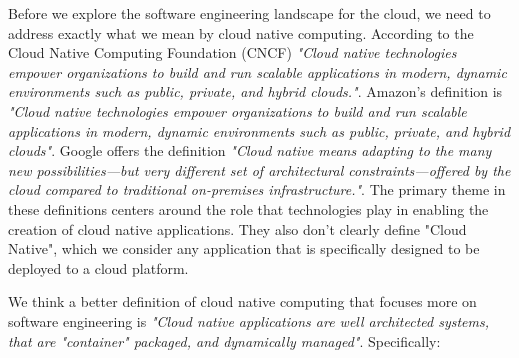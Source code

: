 \documentclass[conference]{IEEEconf}
\begin{document}
Before we explore the software engineering landscape for the cloud, we need to address exactly what we mean by cloud native computing.  According to the Cloud Native Computing Foundation (CNCF)\cite{CNCFHome}  \textit{"Cloud native technologies empower organizations to build and run scalable applications in modern, dynamic environments such as public, private, and hybrid clouds."}.  Amazon's definition is \textit{"Cloud native technologies empower organizations to build and run scalable applications in modern, dynamic environments such as public, private, and hybrid clouds"}. Google offers the definition \textit{"Cloud native means adapting to the many new possibilities—but very different set of architectural constraints—offered by the cloud compared to traditional on-premises infrastructure."}.  The primary theme in these definitions centers around the role that technologies play in enabling the creation of cloud native applications.  They also don't clearly define "Cloud Native", which we consider any application that is specifically designed to be deployed to a cloud platform. 

We think a better definition of cloud native computing that focuses more on  software engineering is \textit{"Cloud native applications are well architected systems, that are "container" packaged, and dynamically managed"}. Specifically:
\end{document}
